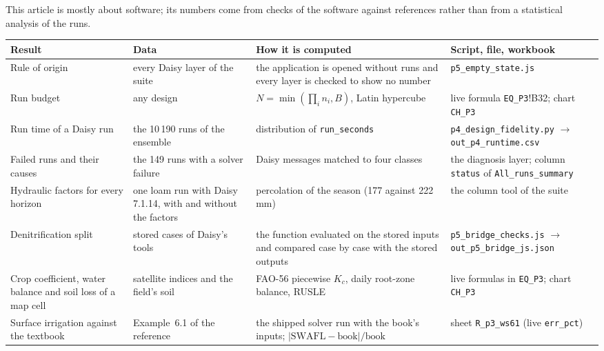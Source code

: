 
\noindent This article is mostly about software; its numbers come from checks of the software against references rather than from a statistical analysis of the runs.
{\footnotesize\begin{longtable}{>{\raggedright\arraybackslash}p{}>{\raggedright\arraybackslash}p{}>{\raggedright\arraybackslash}p{}>{\raggedright\arraybackslash}p{}}
\toprule Result & Data & How it is computed & Script, file, workbook\\\midrule\endhead
Rule of origin & every Daisy layer of the suite & the application is opened without runs and every layer is checked to show no number & \texttt{p5\_\allowbreak{}empty\_\allowbreak{}state.js}\\
Run budget & any design & $N=\min(\prod_in_i,B)$, Latin hypercube & live formula \texttt{EQ\_\allowbreak{}P3}!B32; chart \texttt{CH\_\allowbreak{}P3}\\
Run time of a Daisy run & the 10\,190 runs of the ensemble & distribution of \texttt{run\_\allowbreak{}seconds} & \texttt{p4\_\allowbreak{}design\_\allowbreak{}fidelity.py} $\to$ \texttt{out\_\allowbreak{}p4\_\allowbreak{}runtime.csv}\\
Failed runs and their causes & the 149 runs with a solver failure & Daisy messages matched to four classes & the diagnosis layer; column \texttt{status} of \texttt{All\_\allowbreak{}runs\_\allowbreak{}summary}\\
Hydraulic factors for every horizon & one loam run with Daisy 7.1.14, with and without the factors & percolation of the season (177 against 222\,mm) & the column tool of the suite\\
Denitrification split & 792 stored cases of Daisy's tools & the function evaluated on the stored inputs and compared case by case with the stored outputs & \texttt{p5\_\allowbreak{}bridge\_\allowbreak{}checks.js} $\to$ \texttt{out\_\allowbreak{}p5\_\allowbreak{}bridge\_\allowbreak{}js.json}\\
Crop coefficient, water balance and soil loss of a map cell & satellite indices and the field's soil & FAO-56 piecewise $K_c$, daily root-zone balance, RUSLE & live formulas in \texttt{EQ\_\allowbreak{}P3}; chart \texttt{CH\_\allowbreak{}P3}\\
Surface irrigation against the textbook & Example~6.1 of the reference & the shipped solver run with the book's inputs; $|\text{SWAFL}-\text{book}|/\text{book}$ & sheet \texttt{R\_\allowbreak{}p3\_\allowbreak{}ws61} (live \texttt{err\_\allowbreak{}pct})\\\bottomrule
\end{longtable}}
